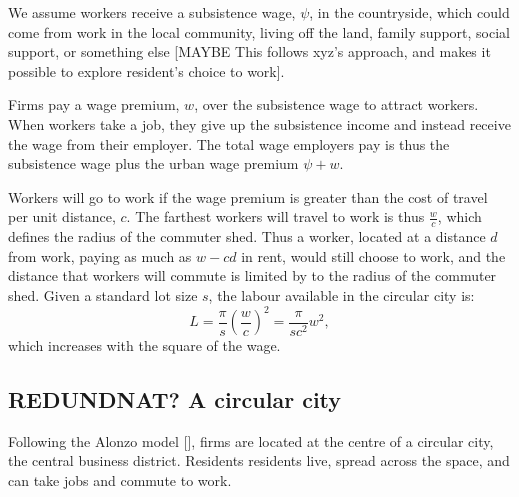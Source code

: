 We assume workers receive a subsistence wage, $\psi$, in the countryside, which could come from work in the local community, living off the land, family support, social support, or something else [MAYBE This follows xyz's approach, and makes it possible to explore resident's choice to work]. 

Firms pay a wage premium, $w$, over the subsistence wage to attract workers. 
When workers take a job, they give up the subsistence income and instead receive the wage from their employer. 
The total wage employers pay is thus the subsistence wage plus the urban wage premium  $\psi + w$.


Workers will go to work if the wage premium is greater than the cost of travel per unit distance, ${c}$. 
The farthest workers will travel to work is thus $\frac{w}{{c}}$, which defines the radius of the commuter shed. Thus a worker, located at a distance $d$ from work, paying as much as $w-{c} d$ in rent, would still choose to work, and the distance that workers will commute is limited by to the radius of the commuter shed. Given a standard lot size $s$, the labour available in the circular city is:
\begin{equation}
 L = \frac{\pi}{s} \left(\frac{w}{{c}}\right)^2
   = \frac{\pi}{s {c}^2} w^2,
\label{eqn-labour-supply1}
\end{equation}
which increases with the square of the wage.


\subsection{REDUNDNAT? A circular city} %

Following the Alonzo model [], firms are located at the centre of a circular city, the central business district. Residents residents live, spread across the space, and can take jobs and commute to work.


